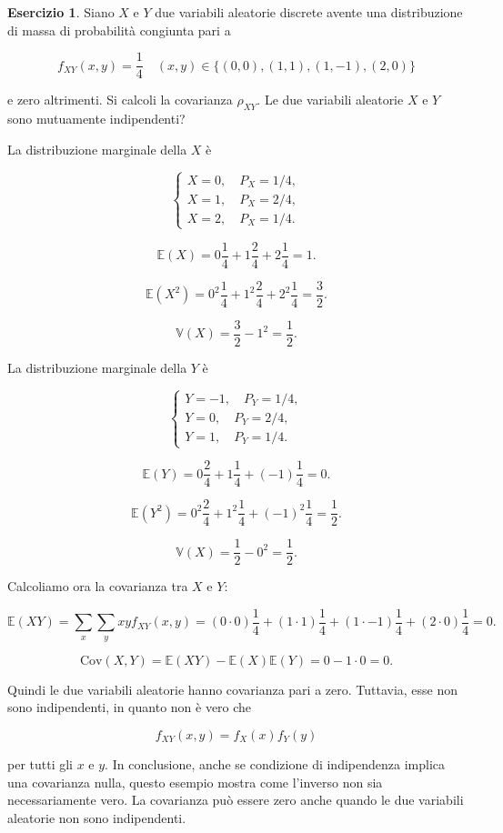 \documentclass[
  11pt,
]{krantz}
\theoremstyle{definition}
\theoremstyle{definition}
\theoremstyle{definition}
\newtheorem{exercise}{Esercizio}[chapter]
\theoremstyle{definition}
\theoremstyle{remark}
\begin{document}
\begin{exercise}
Siano \(X\) e \(Y\) due variabili aleatorie discrete avente una distribuzione di massa di probabilità congiunta pari a

\[
f_{XY}(x,y) = \frac{1}{4} \quad (x,y) \in \{(0,0), (1,1), (1, -1), (2,0) \}
\]

e zero altrimenti. Si calcoli la covarianza \(\rho_{XY}\). Le due variabili aleatorie \(X\) e \(Y\) sono mutuamente indipendenti?

La distribuzione marginale della \(X\) è

\[
\begin{cases}
X = 0, \quad  P_X = 1/4, \\
X = 1, \quad P_X = 2/4, \\
X = 2, \quad P_X = 1/4.
\end{cases}
\]

\[
\mathbb{E}(X) = 0 \frac{1}{4} + 1 \frac{2}{4} + 2 \frac{1}{4} = 1.
\]

\[
\mathbb{E}(X^2) = 0^2 \frac{1}{4} + 1^2 \frac{2}{4} + 2^2 \frac{1}{4} = \frac{3}{2}.
\]

\[
\mathbb{V}(X) = \frac{3}{2} - 1^2 = \frac{1}{2}.
\]

La distribuzione marginale della \(Y\) è

\[
\begin{cases}
Y = -1, \quad  P_Y = 1/4, \\
Y = 0, \quad P_Y = 2/4, \\
Y = 1, \quad P_Y = 1/4.
\end{cases}
\]

\[
\mathbb{E}(Y) = 0 \frac{2}{4} + 1 \frac{1}{4} + (-1) \frac{1}{4} = 0.
\]

\[
\mathbb{E}(Y^2) = 0^2 \frac{2}{4} + 1^2 \frac{1}{4} + (-1)^2 \frac{1}{4} = \frac{1}{2}.
\]

\[
\mathbb{V}(X) = \frac{1}{2} - 0^2 = \frac{1}{2}.
\]

Calcoliamo ora la covarianza tra \(X\) e \(Y\):

\[
\mathbb{E}(XY) = \sum_x\sum_y xy f_{XY} (x,y) =
(0\cdot 0)\frac{1}{4} +
(1\cdot 1)\frac{1}{4} +
(1\cdot -1)\frac{1}{4} +
(2\cdot 0)\frac{1}{4} = 0.
\]

\[
\mbox{Cov}(X,Y) = \mathbb{E}(XY) - \mathbb{E}(X)\mathbb{E}(Y) = 0 - 1\cdot0 = 0.
\]

Quindi le due variabili aleatorie hanno covarianza pari a zero. Tuttavia, esse non sono indipendenti, in quanto non è vero che

\[
f_{XY} (x,y) = f_X(x) f_Y(y)
\]

per tutti gli \(x\) e \(y\). In conclusione, anche se condizione di indipendenza implica una covarianza nulla, questo esempio mostra come l'inverso non sia necessariamente vero. La covarianza può essere zero anche quando le due variabili aleatorie non sono indipendenti.
\end{exercise}
\end{document}
